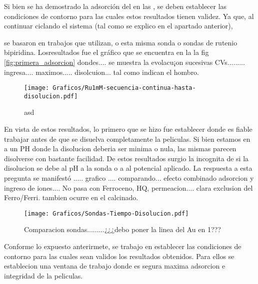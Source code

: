 	Si bien se ha demostrado la adsorción del \aminorutenio\space en las \pdm, se deben establecer las condiciones de contorno para las cuales estos resultados tienen validez. Ya que, al continuar ciclando el sistema (tal como se explico en el apartado anterior), 



	se basaron en trabajos que utilizan, o esta misma sonda\cite{} o sondas de rutenio bipiridina. Losresultados fue el gráfico  que se encuentra en la la fig \ref{fig:primera_adsorcion} dondes.... se muestra la evolacu¡on sucesivas CVs......... ingresa.... maximos..... disolcuion... tal como indican el hombro.

			\begin{figure}[ht]
				\centering
		 	    \texttt{[image: Graficos/Ru1mM-secuencia-continua-hasta-disolucion.pdf]}
		        \caption[asd]{asd}
		        \label{fig:asd}
		      	\end{figure} 

		
	

	En vista de estos resultados, lo primero que se hizo fue establecer donde es fiable trabajar antes de que se disuelva completamente la peliculas. Si bien estamos en a un PH donde la disolucion deberia ser minima o nula, las mismas parecen disolverse con bastante facilidad. De estos resultados surgio la incognita de si la disolucion se debe al pH a la sonda o a al potencial aplicado. La respuesta a esta pregunta se manifestó ..... grafico .... comparando... efecto combinado adsorcion y ingreso de iones.... No pasa con Ferroceno, HQ, permeacion.... clara exclusion del Ferro/Ferri. tambien ocurre en el calcinado.

			\begin{figure}[ht]
				\centering
		 	    \texttt{[image: Graficos/Sondas-Tiempo-Disolucion.pdf]}
		        \caption[AAAAAAaa]{Comparacion sondas.........¿¿¿debo poner la linea del Au en 1???}
		      	\end{figure}

	Conforme lo expuesto anterirmete, se trabajo en establecer las condiciones de contorno para las cuales sean validos los resultados obtenidos. Para ellos se establecion una ventana de trabajo donde es segura maxima adsorcion e integridad de la peliculas.
			
